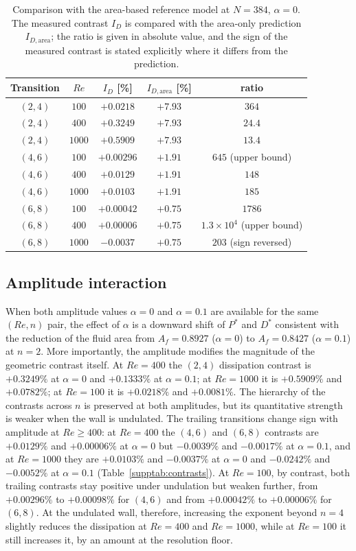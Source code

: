 \begin{table}[!htbp]
\centering
\caption{Comparison with the area-based reference model at $N=384$, $\alpha=0$. The measured contrast $I_D$ is compared with the area-only prediction $I_{D,\mathrm{area}}$; the ratio is given in absolute value, and the sign of the measured contrast is stated explicitly where it differs from the prediction.}
\label{supptab:area}
\begin{tabular}{@{}ccccc@{}}
\hline
Transition & $Re$ & $I_D$ [\%] & $I_{D,\mathrm{area}}$ [\%] & ratio \\
\hline
$(2,4)$ & $100$  & $+0.0218$ & $+7.93$ & $364$ \\
$(2,4)$ & $400$  & $+0.3249$ & $+7.93$ & $24.4$ \\
$(2,4)$ & $1000$ & $+0.5909$ & $+7.93$ & $13.4$ \\
$(4,6)$ & $100$  & $+0.00296$& $+1.91$ & $645$ (upper bound) \\
$(4,6)$ & $400$  & $+0.0129$ & $+1.91$ & $148$ \\
$(4,6)$ & $1000$ & $+0.0103$ & $+1.91$ & $185$ \\
$(6,8)$ & $100$  & $+0.00042$& $+0.75$ & $1786$ \\
$(6,8)$ & $400$  & $+0.00006$& $+0.75$ & $1.3\times10^{4}$ (upper bound) \\
$(6,8)$ & $1000$ & $-0.0037$ & $+0.75$ & $203$ (sign reversed) \\
\hline
\end{tabular}
\end{table}

\subsection{Amplitude interaction}

When both amplitude values $\alpha=0$ and $\alpha=0.1$ are available for the same $(Re,n)$ pair, the effect of $\alpha$ is a downward shift of $P^*$ and $D^*$ consistent with the reduction of the fluid area from $A_f=0.8927$ ($\alpha=0$) to $A_f=0.8427$ ($\alpha=0.1$) at $n=2$. More importantly, the amplitude modifies the magnitude of the geometric contrast itself. At $Re=400$ the $(2,4)$ dissipation contrast is $+0.3249\%$ at $\alpha=0$ and $+0.1333\%$ at $\alpha=0.1$; at $Re=1000$ it is $+0.5909\%$ and $+0.0782\%$; at $Re=100$ it is $+0.0218\%$ and $+0.0081\%$. The hierarchy of the contrasts across $n$ is preserved at both amplitudes, but its quantitative strength is weaker when the wall is undulated. The trailing transitions change sign with amplitude at $Re\ge400$: at $Re=400$ the $(4,6)$ and $(6,8)$ contrasts are $+0.0129\%$ and $+0.00006\%$ at $\alpha=0$ but $-0.0039\%$ and $-0.0017\%$ at $\alpha=0.1$, and at $Re=1000$ they are $+0.0103\%$ and $-0.0037\%$ at $\alpha=0$ and $-0.0242\%$ and $-0.0052\%$ at $\alpha=0.1$ (Table~\ref{supptab:contrasts}). At $Re=100$, by contrast, both trailing contrasts stay positive under undulation but weaken further, from $+0.00296\%$ to $+0.00098\%$ for $(4,6)$ and from $+0.00042\%$ to $+0.00006\%$ for $(6,8)$. At the undulated wall, therefore, increasing the exponent beyond $n=4$ slightly reduces the dissipation at $Re=400$ and $Re=1000$, while at $Re=100$ it still increases it, by an amount at the resolution floor.

